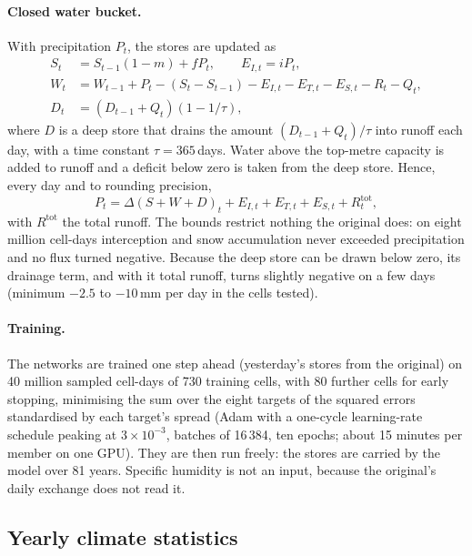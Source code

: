 \documentclass[11pt,a4paper]{article}
\begin{document}
\paragraph{Closed water bucket.} With precipitation $P_t$, the stores are updated as
\begin{align}
  S_t &= S_{t-1}(1-m) + f P_t, \qquad E_{I,t} = i P_t, \\
  W_t &= W_{t-1} + P_t - (S_t - S_{t-1}) - E_{I,t} - E_{T,t} - E_{S,t} - R_t - Q_t, \\
  D_t &= \left(D_{t-1} + Q_t\right)\left(1 - 1/\tau\right) ,
\end{align}
where $D$ is a deep store that drains the amount $(D_{t-1}+Q_t)/\tau$ into runoff each day, with a time constant
$\tau = 365$\,days. Water above the top-metre capacity is added to runoff and a deficit below zero is taken from the
deep store. Hence, every day and to rounding precision,
\begin{equation}
  P_t = \Delta(S + W + D)_t + E_{I,t} + E_{T,t} + E_{S,t} + R^{\mathrm{tot}}_t ,
\end{equation}
with $R^{\mathrm{tot}}$ the total runoff. The bounds restrict nothing the original does: on eight million cell-days
interception and snow accumulation never exceeded precipitation and no flux turned negative. Because the deep store can
be drawn below zero, its drainage term, and with it total runoff, turns slightly negative on a few days (minimum
$-2.5$ to $-10$\,mm per day in the cells tested).

\paragraph{Training.} The networks are trained one step ahead (yesterday's stores from the original) on 40 million
sampled cell-days of 730 training cells, with 80 further cells for early stopping, minimising the sum over the eight
targets of the squared errors standardised by each target's spread (Adam with a one-cycle learning-rate schedule
peaking at $3\times10^{-3}$, batches of 16\,384, ten epochs; about 15 minutes per member on one GPU). They are then run
freely: the stores are carried by the model over 81 years. Specific humidity is not an input, because the original's
daily exchange does not read it.

\subsection{Yearly climate statistics}
\end{document}
